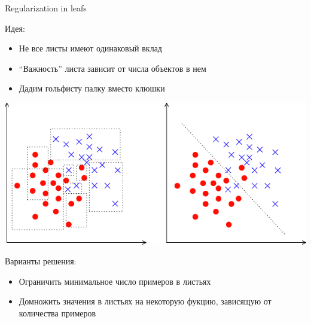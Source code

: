 \documentclass[10pt]{beamer}
\begin{document}
\begin{frame}{Regularization in leafs}
\begin{block}{Идея:}
\end{block}
\begin{itemize}
    \item Не все листы имеют одинаковый вклад
    \item ``Важность'' листа зависит от числа объектов в нем
    \item Дадим гольфисту палку вместо клюшки
\end{itemize}
\begin{center}
    \includegraphics[scale=0.3]{images/leafs.png}
\end{center}
\begin{block}{Варианты решения:}
\end{block}
\begin{itemize}
    \item Ограничить минимальное число примеров в листьях
    \item Домножить значения в листьях на некоторую фукцию, зависящую от
        количества примеров
\end{itemize}
\end{frame}
\end{document}
